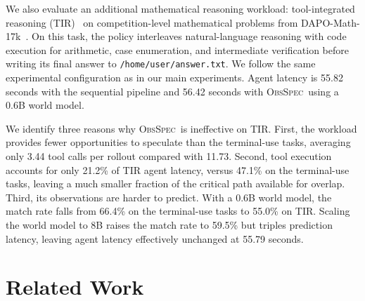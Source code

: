 \documentclass{article} %
\newcommand{\method}{\textsc{ObsSpec}}
\begin{document}
We also evaluate an additional mathematical reasoning workload: tool-integrated reasoning (TIR)~\citep{gou2024tora,yang2024qwenmath} on competition-level mathematical problems from DAPO-Math-17k~\citep{yu2026dapo}. On this task, the policy interleaves natural-language reasoning with code execution for arithmetic, case enumeration, and intermediate verification before writing its final answer to \texttt{/home/user/answer.txt}. We follow the same experimental configuration as in our main experiments. Agent latency is 55.82 seconds with the sequential pipeline and 56.42 seconds with \method\ using a 0.6B world model.

We identify three reasons why \method\ is ineffective on TIR. First, the workload provides fewer opportunities to speculate than the terminal-use tasks, averaging only 3.44 tool calls per rollout compared with 11.73. Second, tool execution accounts for only 21.2\% of TIR agent latency, versus 47.1\% on the terminal-use tasks, leaving a much smaller fraction of the critical path available for overlap. Third, its observations are harder to predict. With a 0.6B world model, the match rate falls from 66.4\% on the terminal-use tasks to 55.0\% on TIR. Scaling the world model to 8B raises the match rate to 59.5\% but triples prediction latency, leaving agent latency effectively unchanged at 55.79 seconds.

\section{Related Work}
\end{document}
